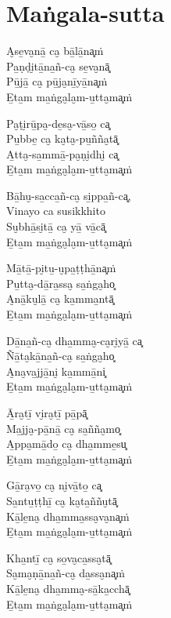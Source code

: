 \clearpage

\chapter{Maṅgala-sutta}


\begin{paritta}
A̮se̱va̮nā̱ ca̮ bā̱lā̱na͓ṁ\\
Pa̱ṇḍi̮tā̱na̱ñ-ca̮ se̱va̮nā͓\\
Pū̱jā̱ ca̮ pū̱ja̮nī̱yā̱na͓ṁ\\
E̱ta̱m ma̱ṅga̮la̮m-u̱tta̮ma͓ṁ

Pa̮ṭi̮rū̱pa̮-de̱sa̮-vā̱so̱ ca͓\\
Pu̱bbe̱ ca̮ ka̮ta̮-pu̱ñña̮tā͓\\
A̱tta̮-sa̱mmā̱-pa̮ṇi̮dhi̮ ca͓\\
E̱ta̱m ma̱ṅga̮la̮m-u̱tta̮ma͓ṁ

Bā̱hu̮-sa̱cca̱ñ-ca̮ si̱ppa̱ñ-ca͓,\\
Vinayo ca susikkhito\\
Su̮bhā̱si̮tā̱ ca̮ yā̱ vā̱cā͓\\
E̱ta̱m ma̱ṅga̮la̮m-u̱tta̮ma͓ṁ

Mā̱tā̱-pi̮tu̱-u̮pa̱ṭṭhā̱na͓ṁ\\
Pu̱tta̮-dā̱ra̱ssa̮ sa̱ṅga̮ho͓\\
A̮nā̱ku̮lā̱ ca̮ ka̱mma̱ntā͓\\
E̱ta̱m ma̱ṅga̮la̮m-u̱tta̮ma͓ṁ

Dā̱na̱ñ-ca̮ dha̱mma̮-ca̮ri̮yā̱ ca͓\\
Ñā̱ta̮kā̱na̱ñ-ca̮ sa̱ṅga̮ho͓\\
A̮na̮va̱jjā̱ni̮ ka̱mmā̱ni͓\\
E̱ta̱m ma̱ṅga̮la̮m-u̱tta̮ma͓ṁ

Ā̱ra̮tī̱ vi̮ra̮tī̱ pā̱pā͓\\
Ma̱jja̮-pā̱nā̱ ca̮ sa̱ñña̮mo͓\\
A̱ppa̮mā̱do̱ ca̮ dha̱mme̱su͓\\
E̱ta̱m ma̱ṅga̮la̮m-u̱tta̮ma͓ṁ

Gā̱ra̮vo̱ ca̮ ni̮vā̱to̱ ca͓\\
Sa̱ntu̱ṭṭhī̱ ca̮ ka̮ta̱ññu̮tā͓\\
Kā̱le̱na̮ dha̱mma̱ssa̮va̮na͓ṁ\\
E̱ta̱m ma̱ṅga̮la̮m-u̱tta̮ma͓ṁ

Kha̱ntī̱ ca̮ so̱va̮ca̱ssa̮tā͓\\
Sa̮ma̮ṇā̱na̱ñ-ca̮ da̱ssa̮na͓ṁ\\
Kā̱le̱na̮ dha̱mma̮-sā̱ka̱cchā͓\\
E̱ta̱m ma̱ṅga̮la̮m-u̱tta̮ma͓ṁ


\end{paritta}
